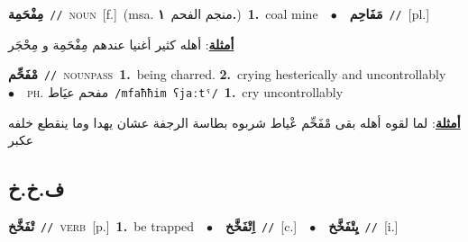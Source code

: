 \documentclass[10pt,a4paper,twoside]{article} %
\begin{document}
\begin{multicols}{2}
{\setlength\topsep{0pt}\textbf{\foreignlanguage{arabic}{مِفْحَمِة}}\ {\color{gray}\texttt{//}\color{black}}\ \textsc{noun}\ [f.]\ \color{gray}(msa. \foreignlanguage{arabic}{منجم الفحم}~\foreignlanguage{arabic}{\textbf{١.}})\color{black}\ \textbf{1.}~coal mine\ \ $\bullet$\ \ \setlength\topsep{0pt}\textbf{\foreignlanguage{arabic}{مَفَاحِم}}\ {\color{gray}\texttt{//}\color{black}}\ [pl.]\  \begin{flushright}\color{gray}\foreignlanguage{arabic}{\textbf{\underline{\foreignlanguage{arabic}{أمثلة}}}: أهله كثير أغنيا عندهم مِفْحَمِة و مِحْجَر}\end{flushright}\color{black}} \vspace{2mm}

{\setlength\topsep{0pt}\textbf{\foreignlanguage{arabic}{مْفَحِّم}}\ {\color{gray}\texttt{//}\color{black}}\ \textsc{noun\textunderscore pass}\ \textbf{1.}~being charred.  \textbf{2.}~crying hesterically and uncontrollably\ \ $\bullet$\ \ \textsc{ph.} \color{gray} \foreignlanguage{arabic}{مفحم عيَاط}\color{black}\ {\color{gray}\texttt{/{\sffamily mfaħħim ʕjaːtˤ}/}\color{black}}\ \textbf{1.}~cry uncontrollably\  \begin{flushright}\color{gray}\foreignlanguage{arabic}{\textbf{\underline{\foreignlanguage{arabic}{أمثلة}}}: لما لقوه أهله بقى مْفَحِّم عْياط شربوه بطاسة الرجفة عشان يهدا وما ينقطع خلفه عكبر}\end{flushright}\color{black}} \vspace{2mm}

\vspace{-3mm}
\subsection*{\color{blue}\foreignlanguage{arabic}{ف.خ.خ}\color{blue}{}} 

{\setlength\topsep{0pt}\textbf{\foreignlanguage{arabic}{تْفَخَّخ}}\ {\color{gray}\texttt{//}\color{black}}\ \textsc{verb}\ [p.]\ \textbf{1.}~be trapped\ \ $\bullet$\ \ \setlength\topsep{0pt}\textbf{\foreignlanguage{arabic}{اِتْفَخَّخ}}\ {\color{gray}\texttt{//}\color{black}}\ [c.]\ \ $\bullet$\ \ \setlength\topsep{0pt}\textbf{\foreignlanguage{arabic}{يِتْفَخَّخ}}\ {\color{gray}\texttt{//}\color{black}}\ [i.]\ } \vspace{2mm}


\end{multicols}
\end{document}
